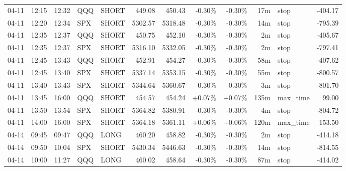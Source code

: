\documentclass[11pt,a4paper,twoside]{article}
\begin{document}
\begin{center}
\begin{longtable}{>{\color{txtmain}}l l l l l r r r r r >{\color{txtmain}}l r}
04-11 & 12:15 & 12:32 & QQQ & SHORT & 449.08 & 450.43 & \textcolor{lossred}{-0.30\%} & \textcolor{lossred}{-0.30\%} & 17m & stop & \textcolor{lossred}{-404.17} \\
04-11 & 12:20 & 12:34 & SPX & SHORT & 5302.57 & 5318.48 & \textcolor{lossred}{-0.30\%} & \textcolor{lossred}{-0.30\%} & 14m & stop & \textcolor{lossred}{-795.39} \\
04-11 & 12:35 & 12:37 & QQQ & SHORT & 450.75 & 452.10 & \textcolor{lossred}{-0.30\%} & \textcolor{lossred}{-0.30\%} & 2m & stop & \textcolor{lossred}{-405.67} \\
04-11 & 12:35 & 12:37 & SPX & SHORT & 5316.10 & 5332.05 & \textcolor{lossred}{-0.30\%} & \textcolor{lossred}{-0.30\%} & 2m & stop & \textcolor{lossred}{-797.41} \\
04-11 & 12:45 & 13:43 & QQQ & SHORT & 452.91 & 454.27 & \textcolor{lossred}{-0.30\%} & \textcolor{lossred}{-0.30\%} & 58m & stop & \textcolor{lossred}{-407.62} \\
04-11 & 12:45 & 13:40 & SPX & SHORT & 5337.14 & 5353.15 & \textcolor{lossred}{-0.30\%} & \textcolor{lossred}{-0.30\%} & 55m & stop & \textcolor{lossred}{-800.57} \\
04-11 & 13:40 & 13:43 & SPX & SHORT & 5344.64 & 5360.67 & \textcolor{lossred}{-0.30\%} & \textcolor{lossred}{-0.30\%} & 3m & stop & \textcolor{lossred}{-801.70} \\
04-11 & 13:45 & 16:00 & QQQ & SHORT & 454.57 & 454.24 & \textcolor{wingreen}{+0.07\%} & \textcolor{wingreen}{+0.07\%} & 135m & max\_time & \textcolor{wingreen}{99.00} \\
04-11 & 13:50 & 13:54 & SPX & SHORT & 5364.82 & 5380.91 & \textcolor{lossred}{-0.30\%} & \textcolor{lossred}{-0.30\%} & 4m & stop & \textcolor{lossred}{-804.72} \\
04-11 & 14:00 & 16:00 & SPX & SHORT & 5364.18 & 5361.11 & \textcolor{wingreen}{+0.06\%} & \textcolor{wingreen}{+0.06\%} & 120m & max\_time & \textcolor{wingreen}{153.50} \\
04-14 & 09:45 & 09:47 & QQQ & LONG & 460.20 & 458.82 & \textcolor{lossred}{-0.30\%} & \textcolor{lossred}{-0.30\%} & 2m & stop & \textcolor{lossred}{-414.18} \\
04-14 & 09:50 & 10:04 & SPX & SHORT & 5430.34 & 5446.63 & \textcolor{lossred}{-0.30\%} & \textcolor{lossred}{-0.30\%} & 14m & stop & \textcolor{lossred}{-814.55} \\
04-14 & 10:00 & 11:27 & QQQ & LONG & 460.02 & 458.64 & \textcolor{lossred}{-0.30\%} & \textcolor{lossred}{-0.30\%} & 87m & stop & \textcolor{lossred}{-414.02} \\

\end{longtable}
\end{center}
\end{document}

